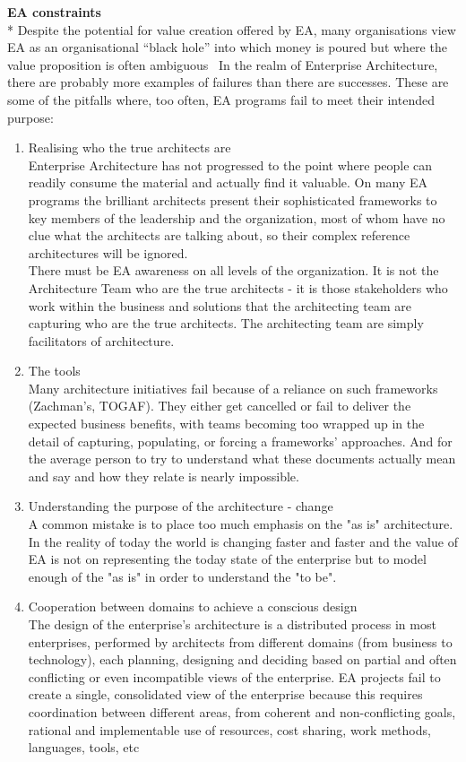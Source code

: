 \documentclass[runningheads]{llncs}
\begin{document}
\textbf{EA constraints}
\\*
Despite the potential for value creation offered by EA, many organisations view EA as an organisational “black hole” into which money is poured but where the value proposition is often ambiguous~\cite{ref_6}
In the realm of Enterprise Architecture, there are probably more examples of failures than there are successes. These are some of the pitfalls where, too often, EA programs fail to meet their intended purpose:
\begin{enumerate}
\item Realising who the true architects are
\\
Enterprise Architecture has not progressed to the point where people can readily consume the material and actually find it valuable. On many EA programs the brilliant architects present their sophisticated frameworks to key members of the leadership and the organization, most of whom have no clue what the architects are talking about, so their complex reference architectures will be ignored. \\
There must be EA awareness on all levels of the organization.
It is not the Architecture Team who are the true architects - it is those stakeholders who work within the business and solutions that the architecting team are capturing who are the true architects. The architecting team are simply facilitators of architecture.~\cite{ref_14}\\

\item The tools
\\
Many architecture initiatives fail because of a reliance on such frameworks (Zachman’s, TOGAF). They either get cancelled or fail to deliver the expected business benefits, with teams becoming too wrapped up in the detail of capturing, populating, or forcing a frameworks’ approaches. And for the average person to try to understand what these documents actually mean and say and how they relate is nearly impossible.\\
\item Understanding the purpose of the architecture - change
\\
A common mistake is to place too much emphasis on the "as is" architecture. In the reality of today the world is changing faster and faster and the value of EA is not on representing the today state of the enterprise but to model enough of the "as is" in order to understand the "to be".\\
\item Cooperation between domains to achieve a conscious design
\\
The design of the enterprise's architecture is a distributed process in most enterprises, performed by architects from different domains (from business to technology), each planning, designing and deciding based on partial and often conflicting or even incompatible views of the enterprise. EA projects fail to create a single, consolidated view of the enterprise because this requires coordination between different areas, from coherent and non-conflicting goals, rational and implementable use of resources, cost sharing, work methods, languages, tools, etc ~\cite{ref_5}
\end{enumerate}
\end{document}
